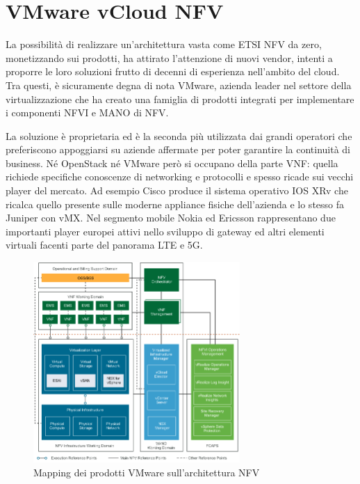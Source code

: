 \section{VMware vCloud NFV}

La possibilità di realizzare un'architettura vasta come ETSI NFV da zero, monetizzando sui prodotti, ha attirato l'attenzione di nuovi vendor, intenti a proporre le loro soluzioni frutto di decenni di esperienza nell'ambito del cloud. Tra questi, è sicuramente degna di nota VMware, azienda leader nel settore della virtualizzazione che ha creato una famiglia di prodotti integrati per implementare i componenti NFVI e MANO di NFV.

La soluzione è proprietaria ed è la seconda più utilizzata dai grandi operatori che preferiscono appoggiarsi su aziende affermate per poter garantire la continuità di business. Né OpenStack né VMware però si occupano della parte VNF: quella richiede specifiche conoscenze di networking e protocolli e spesso ricade sui vecchi player del mercato. Ad esempio Cisco produce il sistema operativo IOS XRv che ricalca quello presente sulle moderne appliance fisiche dell'azienda e lo stesso fa Juniper con vMX. Nel segmento mobile Nokia ed Ericsson rappresentano due importanti player europei attivi nello sviluppo di gateway ed altri elementi virtuali facenti parte del panorama LTE e 5G.

\begin{figure}[htb]
    \includegraphics[width=0.7\textwidth]{graphics/vmware-nfv.png}
    \caption{Mapping dei prodotti VMware sull'architettura NFV \cite{vmware-vcloud}}
    \label{fig:vmware-nfv}
\end{figure}


